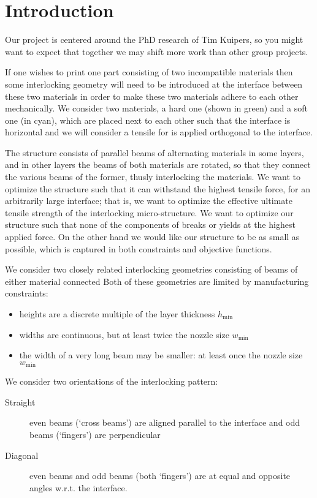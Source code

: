 \section{Introduction}
Our project is centered around the PhD research of Tim Kuipers, so you might want to expect that together we may shift more work than other group projects.

\medskip

If one wishes to print one part consisting of two incompatible materials then some interlocking geometry will need to be introduced at the interface between these two materials in order to make these two materials adhere to each other mechanically.
We consider two materials, a hard one (shown in green) and a soft one (in cyan), which are placed next to each other such that the interface is horizontal
and we will consider a tensile for is applied orthogonal to the interface.

The structure consists of parallel beams of alternating materials in some layers, and in other layers the beams of both materials are rotated, so that they connect the various beams of the former, thusly interlocking the materials.
We want to optimize the structure such that it can withstand the highest tensile force, for an arbitrarily large interface;
that is, we want to optimize the effective ultimate tensile strength of the interlocking micro-structure.
We want to optimize our structure such that none of the components of breaks or yields at the highest applied force.
On the other hand we would like our structure to be as small as possible, which is captured in both constraints and objective functions.

We consider two closely related interlocking geometries consisting of beams of either material connected 
Both of these geometries are limited by manufacturing constraints:
\begin{itemize}
	\item heights are a discrete multiple of the layer thickness $h_\text{min}$
	\item widths are continuous, but at least twice the nozzle size $w_\text{min}$
	\item the width of a very long beam may be smaller: at least once the nozzle size $w_\text{min}$
\end{itemize}


We consider two orientations of the interlocking pattern:
\begin{description}
	\item[Straight] even beams (`cross beams') are aligned parallel to the interface and odd beams (`fingers') are perpendicular
	\item[Diagonal] even beams and odd beams (both `fingers') are at equal and opposite angles w.r.t. the interface.
\end{description}

